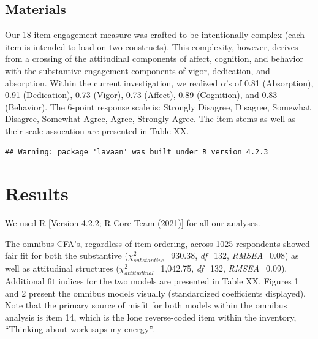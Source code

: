 \documentclass[
  man]{apa6}
\begin{document}
\hypertarget{materials}{%
\subsection{Materials}\label{materials}}

Our 18-item engagement measure was crafted to be intentionally complex (each item is intended to load on two constructs). This complexity, however, derives from a crossing of the attitudinal components of affect, cognition, and behavior with the substantive engagement components of vigor, dedication, and absorption. Within the current investigation, we realized \(\alpha\)'s of 0.81 (Absorption), 0.91 (Dedication), 0.73 (Vigor), 0.73 (Affect), 0.89 (Cognition), and 0.83 (Behavior). The 6-point response scale is: Strongly Disagree, Disagree, Somewhat Disagree, Somewhat Agree, Agree, Strongly Agree. The item stems as well as their scale assocation are presented in Table XX.

\begin{verbatim}
## Warning: package 'lavaan' was built under R version 4.2.3
\end{verbatim}

\hypertarget{results}{%
\section{Results}\label{results}}

We used R {[}Version 4.2.2; R Core Team (2021){]} for all our analyses.

The omnibus CFA's, regardless of item ordering, across 1025 respondents showed fair fit for both the substantive (\(\chi^2_{substantive}\)=930.38, \emph{df}=132, \emph{RMSEA}=0.08) as well as attitudinal structures (\(\chi^2_{attitudinal}\)=1,042.75, \emph{df}=132, \emph{RMSEA}=0.09). Additional fit indices for the two models are presented in Table XX. Figures 1 and 2 present the omnibus models visually (standardized coefficients displayed). Note that the primary source of misfit for both models within the omnibus analysis is item 14, which is the lone reverse-coded item within the inventory, ``Thinking about work saps my energy''.
\end{document}
